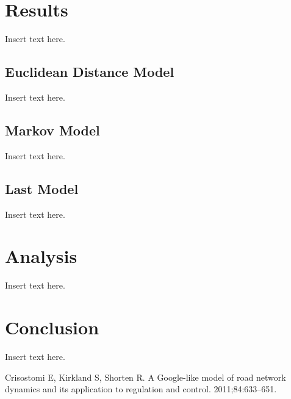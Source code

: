 \documentclass[twoside,twocolumn]{article}
\begin{document}
\section{Results}
\label{sec:res}
Insert text here.
\subsection{Euclidean Distance Model}
Insert text here.
\subsection{Markov Model}
Insert text here.
\subsection{Last Model}
Insert text here.

\section{Analysis}
\label{sec:analysis}
Insert text here.

\section{Conclusion}
\label{sec:conclusion}
Insert text here.


\begin{thebibliography}{99} %

Crisostomi E, Kirkland S, Shorten R. 
\newblock A Google-like model of road network dynamics and its application to regulation and control.
 2011;84:633--651.
 
\end{thebibliography}

\end{document}
